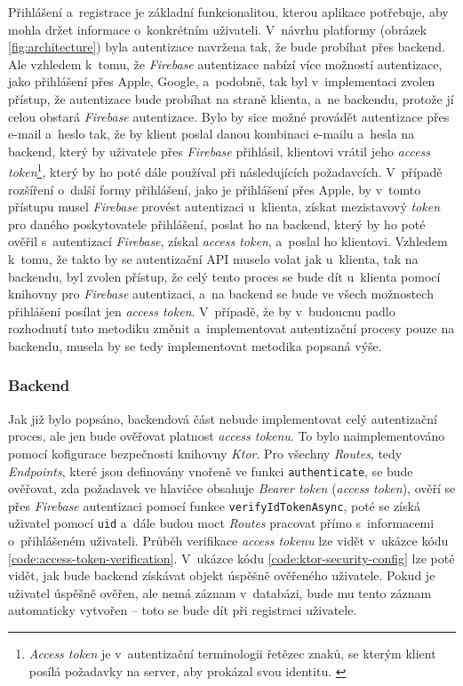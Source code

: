 Přihlášení a~registrace je základní funkcionalitou, kterou aplikace potřebuje, aby mohla držet informace o~konkrétním uživateli. V~návrhu platformy (obrázek \ref{fig:architecture}) byla autentizace navržena tak, že bude probíhat přes backend. Ale vzhledem k~tomu, že \emph{Firebase} autentizace nabízí více možností autentizace, jako přihlášení přes Apple, Google, a~podobně, tak byl v~implementaci zvolen přístup, že autentizace bude probíhat na straně klienta, a~ne backendu, protože jí celou obstará \emph{Firebase} autentizace. Bylo by sice možné provádět autentizace přes e-mail a~heslo tak, že by klient poslal danou kombinaci e-mailu a~hesla na backend, který by uživatele přes \emph{Firebase} přihlásil, klientovi vrátil jeho \emph{access token}\footnote{\emph{Access token} je v~autentizační terminologii řetězec znaků, se kterým klient posílá požadavky na server, aby prokázal svou identitu. \cite{access-token}}, který by ho poté dále používal při následujících požadavcích. V~případě rozšíření o~další formy přihlášení, jako je přihlášení přes Apple, by v~tomto přístupu musel \emph{Firebase} provést autentizaci u~klienta, získat mezistavový \emph{token} pro daného poskytovatele přihlášení, poslat ho na backend, který by ho poté ověřil s~autentizací \emph{Firebase}, získal \emph{access token}, a~poslal ho klientovi. Vzhledem k~tomu, že takto by se autentizační API muselo volat jak u~klienta, tak na backendu, byl zvolen přístup, že celý tento proces se bude dít u~klienta pomocí knihovny pro \emph{Firebase} autentizaci, a~na backend se bude ve všech možnostech přihlášení posílat jen \emph{access token}. V~případě, že by v~budoucnu padlo rozhodnutí tuto metodiku změnit a~implementovat autentizační procesy pouze na backendu, musela by se tedy implementovat metodika popsaná výše.

\subsubsection{Backend}

Jak již bylo popsáno, backendová část nebude implementovat celý autentizační proces, ale jen bude ověřovat platnost \emph{access tokenu}. To bylo naimplementováno pomocí kofigurace bezpečnosti knihovny \emph{Ktor}. Pro všechny \emph{Routes}, tedy \emph{Endpoints}, které jsou definovány vnořeně ve funkci \texttt{authenticate}, se bude ověřovat, zda požadavek ve hlavičce obsahuje \emph{Bearer token} (\emph{access token}), ověří se přes \emph{Firebase} autentizaci pomocí funkce \texttt{verifyIdTokenAsync}, poté se získá uživatel pomocí \texttt{uid} a~dále budou moct \emph{Routes} pracovat přímo s~informacemi o~přihlášeném uživateli. Průběh verifikace \emph{access tokenu} lze vidět v~ukázce kódu \ref{code:access-token-verification}. V~ukázce kódu \ref{code:ktor-security-config} lze poté vidět, jak bude backend získávat objekt úspěšně ověřeného uživatele. Pokud je uživatel úspěšně ověřen, ale nemá záznam v~databázi, bude mu tento záznam automaticky vytvořen – toto se bude dít při registraci uživatele.

